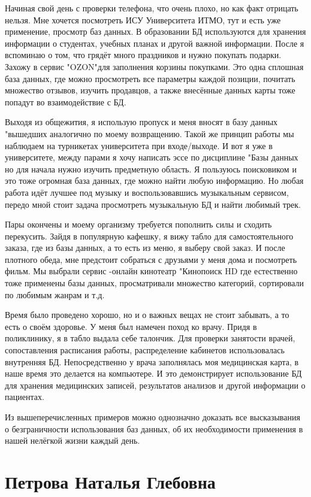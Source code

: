 \documentclass[14pt]{extreport}
\begin{document}
Начиная свой день с проверки телефона, что очень плохо, но как факт
отрицать нельзя. Мне хочется посмотреть ИСУ Университета ИТМО, тут и
есть уже применение, просмотр баз данных. В образовании БД используются
для хранения информации о студентах, учебных планах и другой важной информации. После я вспоминаю о том, что грядёт много праздников и нужно
покупать подарки. Захожу в сервис "OZON"для заполнения корзины покупками. Это одна сплошная база данных, где можно просмотреть все параметры
каждой позиции, почитать множество отзывов, изучить продавцов, а также
внесённые данных карты тоже попадут во взаимодействие с БД.

Выходя из общежития, я использую пропуск и меня вносят в базу данных "вышедших аналогично по моему возвращению. Такой же принцип работы мы наблюдаем на турникетах университета при входе/выходе. И вот я
уже в университете, между парами я хочу написать эссе по дисциплине "Базы данных но для начала нужно изучить предметную область. Я пользуюсь
поисковиком и это тоже огромная база данных, где можно найти любую информацию. Но любая работа идёт лучшее под музыку и воспользовавшись
музыкальным сервисом, передо мной стоит задача просмотреть музыкальную
БД и найти любимый трек.

Пары окончены и моему организму требуется пополнить силы и сходить
перекусить. Зайдя в популярную кафешку, я вижу табло для самостоятельного заказа, где из базы данных, а то есть из меню, я выберу свой заказ. И
после плотного обеда, мне предстоит собраться с друзьями у меня дома и посмотреть фильм. Мы выбрали сервис -онлайн кинотеатр "Кинопоиск HD где
естественно тоже применены базы данных, просматривали множество категорий, сортировали по любимым жанрам и т.д.

Время было проведено хорошо, но и о важных вещах не стоит забывать,
а то есть о своём здоровье. У меня был намечен поход ко врачу. Придя в поликлинику, я в табло выдала себе талончик. Для проверки занятости врачей,
сопоставления расписания работы, распределение кабинетов использовалась
внутренняя БД. Непосредственно у врача заполнялась моя медицинская карта, в наше время это делается на компьютере. И это демонстрирует использование БД для хранения медицинских записей, результатов анализов и другой
информации о пациентах.

Из вышеперечисленных примеров можно однозначно доказать все высказывания о безграничности использования баз данных, об их необходимости
применения в нашей нелёгкой жизни каждый день.

\section{Петрова Наталья Глебовна}
\end{document}
